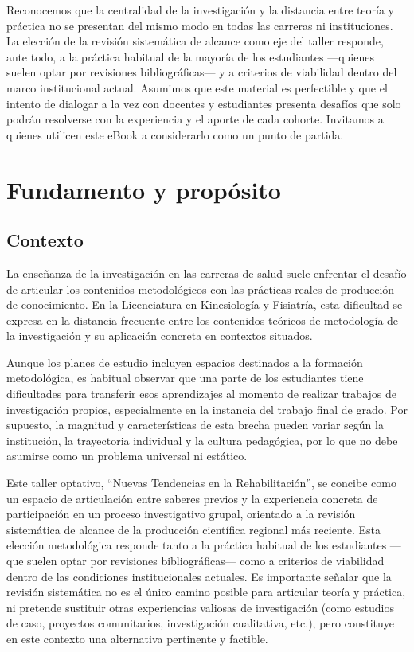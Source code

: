 \documentclass[
  letterpaper,
]{book}
\begin{document}
Reconocemos que la centralidad de la investigación y la distancia entre
teoría y práctica no se presentan del mismo modo en todas las carreras
ni instituciones. La elección de la revisión sistemática de alcance como
eje del taller responde, ante todo, a la práctica habitual de la mayoría
de los estudiantes ---quienes suelen optar por revisiones
bibliográficas--- y a criterios de viabilidad dentro del marco
institucional actual. Asumimos que este material es perfectible y que el
intento de dialogar a la vez con docentes y estudiantes presenta
desafíos que solo podrán resolverse con la experiencia y el aporte de
cada cohorte. Invitamos a quienes utilicen este eBook a considerarlo
como un punto de partida.


\chapter{Fundamento y propósito}\label{fundamento-y-propuxf3sito}

\section{Contexto}\label{contexto}

La enseñanza de la investigación en las carreras de salud suele
enfrentar el desafío de articular los contenidos metodológicos con las
prácticas reales de producción de conocimiento. En la Licenciatura en
Kinesiología y Fisiatría, esta dificultad se expresa en la distancia
frecuente entre los contenidos teóricos de metodología de la
investigación y su aplicación concreta en contextos situados.

Aunque los planes de estudio incluyen espacios destinados a la formación
metodológica, es habitual observar que una parte de los estudiantes
tiene dificultades para transferir esos aprendizajes al momento de
realizar trabajos de investigación propios, especialmente en la
instancia del trabajo final de grado. Por supuesto, la magnitud y
características de esta brecha pueden variar según la institución, la
trayectoria individual y la cultura pedagógica, por lo que no debe
asumirse como un problema universal ni estático.

Este taller optativo, ``Nuevas Tendencias en la Rehabilitación'', se
concibe como un espacio de articulación entre saberes previos y la
experiencia concreta de participación en un proceso investigativo
grupal, orientado a la revisión sistemática de alcance de la producción
científica regional más reciente. Esta elección metodológica responde
tanto a la práctica habitual de los estudiantes ---que suelen optar por
revisiones bibliográficas--- como a criterios de viabilidad dentro de
las condiciones institucionales actuales. Es importante señalar que la
revisión sistemática no es el único camino posible para articular teoría
y práctica, ni pretende sustituir otras experiencias valiosas de
investigación (como estudios de caso, proyectos comunitarios,
investigación cualitativa, etc.), pero constituye en este contexto una
alternativa pertinente y factible.
\end{document}
